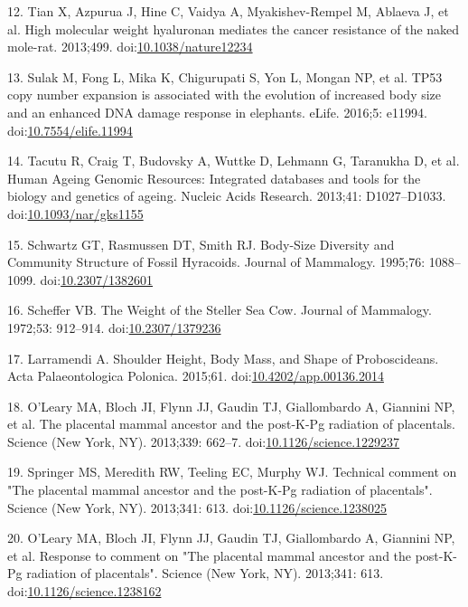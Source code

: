 \documentclass[]{elsarticle} %
\begin{document}
\leavevmode\hypertarget{ref-Tian2013}{}%
12. Tian X, Azpurua J, Hine C, Vaidya A, Myakishev-Rempel M, Ablaeva J, et al. High molecular weight hyaluronan mediates the cancer resistance of the naked mole-rat. 2013;499. doi:\href{https://doi.org/10.1038/nature12234}{10.1038/nature12234}

\leavevmode\hypertarget{ref-Sulak2015}{}%
13. Sulak M, Fong L, Mika K, Chigurupati S, Yon L, Mongan NP, et al. TP53 copy number expansion is associated with the evolution of increased body size and an enhanced DNA damage response in elephants. eLife. 2016;5: e11994. doi:\href{https://doi.org/10.7554/elife.11994}{10.7554/elife.11994}

\leavevmode\hypertarget{ref-HAGR}{}%
14. Tacutu R, Craig T, Budovsky A, Wuttke D, Lehmann G, Taranukha D, et al. Human Ageing Genomic Resources: Integrated databases and tools for the biology and genetics of ageing. Nucleic Acids Research. 2013;41: D1027--D1033. doi:\href{https://doi.org/10.1093/nar/gks1155}{10.1093/nar/gks1155}

\leavevmode\hypertarget{ref-Schwartz1995}{}%
15. Schwartz GT, Rasmussen DT, Smith RJ. Body-Size Diversity and Community Structure of Fossil Hyracoids. Journal of Mammalogy. 1995;76: 1088--1099. doi:\href{https://doi.org/10.2307/1382601}{10.2307/1382601}

\leavevmode\hypertarget{ref-Scheffer1972}{}%
16. Scheffer VB. The Weight of the Steller Sea Cow. Journal of Mammalogy. 1972;53: 912--914. doi:\href{https://doi.org/10.2307/1379236}{10.2307/1379236}

\leavevmode\hypertarget{ref-Larramendi:20151c2}{}%
17. Larramendi A. Shoulder Height, Body Mass, and Shape of Proboscideans. Acta Palaeontologica Polonica. 2015;61. doi:\href{https://doi.org/10.4202/app.00136.2014}{10.4202/app.00136.2014}

\leavevmode\hypertarget{ref-OLeary2013a}{}%
18. O'Leary MA, Bloch JI, Flynn JJ, Gaudin TJ, Giallombardo A, Giannini NP, et al. The placental mammal ancestor and the post-K-Pg radiation of placentals. Science (New York, NY). 2013;339: 662--7. doi:\href{https://doi.org/10.1126/science.1229237}{10.1126/science.1229237}

\leavevmode\hypertarget{ref-Springer2013}{}%
19. Springer MS, Meredith RW, Teeling EC, Murphy WJ. Technical comment on "The placental mammal ancestor and the post-K-Pg radiation of placentals". Science (New York, NY). 2013;341: 613. doi:\href{https://doi.org/10.1126/science.1238025}{10.1126/science.1238025}

\leavevmode\hypertarget{ref-OLeary2013b}{}%
20. O'Leary MA, Bloch JI, Flynn JJ, Gaudin TJ, Giallombardo A, Giannini NP, et al. Response to comment on "The placental mammal ancestor and the post-K-Pg radiation of placentals". Science (New York, NY). 2013;341: 613. doi:\href{https://doi.org/10.1126/science.1238162}{10.1126/science.1238162}
\end{document}
